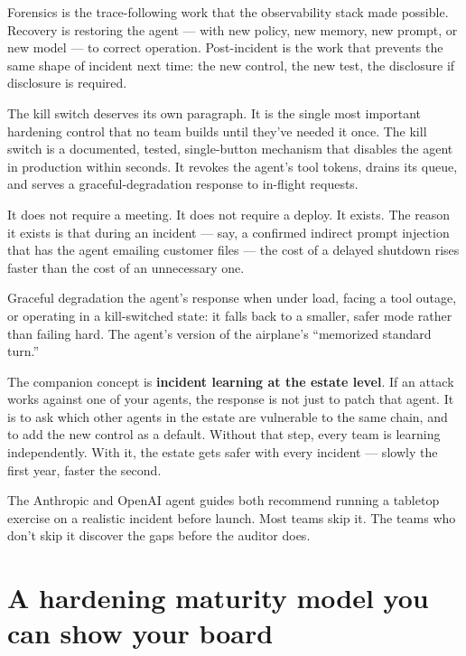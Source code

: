 Forensics is the trace-following work that the observability stack made possible. Recovery is restoring the agent --- with new policy, new memory, new prompt, or new model --- to correct operation. Post-incident is the work that prevents the same shape of incident next time: the new control, the new test, the disclosure if disclosure is required.

The kill switch deserves its own paragraph. It is the single most important hardening control that no team builds until they've needed it once. The kill switch is a documented, tested, single-button mechanism that disables the agent in production within seconds. It revokes the agent's tool tokens, drains its queue, and serves a graceful-degradation response to in-flight requests.

It does not require a meeting. It does not require a deploy. It exists. The reason it exists is that during an incident --- say, a confirmed indirect prompt injection that has the agent emailing customer files --- the cost of a delayed shutdown rises faster than the cost of an unnecessary one.

\begin{TNdefinition}{Graceful degradation}
the agent's response when under load, facing a tool outage, or operating in a kill-switched state: it falls back to a smaller, safer mode rather than failing hard. The agent's version of the airplane's ``memorized standard turn.''
\end{TNdefinition}

The companion concept is \textbf{incident learning at the estate level}. If an attack works against one of your agents, the response is not just to patch that agent. It is to ask which other agents in the estate are vulnerable to the same chain, and to add the new control as a default. Without that step, every team is learning independently. With it, the estate gets safer with every incident --- slowly the first year, faster the second.

The Anthropic and OpenAI agent guides \citep{anthropic-building-agents-2024,openai-practical-agents-2025} both recommend running a tabletop exercise on a realistic incident before launch. Most teams skip it. The teams who don't skip it discover the gaps before the auditor does.

\section{A hardening maturity model you can show your board}


